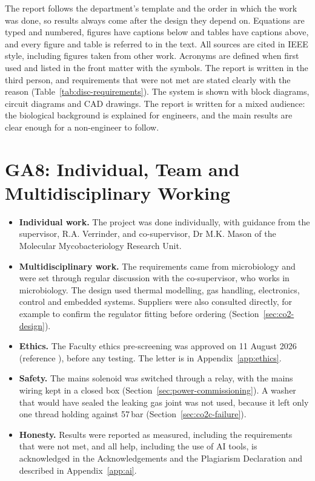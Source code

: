 The report follows the department's template and the order in which the work was done, so results always come after the design they depend on. Equations are typed and numbered, figures have captions below and tables have captions above, and every figure and table is referred to in the text. All sources are cited in IEEE style, including figures taken from other work. Acronyms are defined when first used and listed in the front matter with the symbols. The report is written in the third person, and requirements that were not met are stated clearly with the reason (Table~\ref{tab:disc-requirements}). The system is shown with block diagrams, circuit diagrams and CAD drawings. The report is written for a mixed audience: the biological background is explained for engineers, and the main results are clear enough for a non-engineer to follow.

\section{GA8: Individual, Team and Multidisciplinary Working}
\label{app:ga8}

\begin{itemize}[nosep]
    \item \textbf{Individual work.} The project was done individually, with guidance from the supervisor, R.A. Verrinder, and co-supervisor, Dr M.K. Mason of the Molecular Mycobacteriology Research Unit.
    \item \textbf{Multidisciplinary work.} The requirements came from microbiology and were set through regular discussion with the co-supervisor, who works in microbiology. The design used thermal modelling, gas handling, electronics, control and embedded systems. Suppliers were also consulted directly, for example to confirm the regulator fitting before ordering (Section~\ref{sec:co2-design}).
    \item \textbf{Ethics.} The Faculty ethics pre-screening was approved on 11 August 2026 (reference \ebeethicsnumber), before any testing. The letter is in Appendix~\ref{app:ethics}.
    \item \textbf{Safety.} The mains solenoid was switched through a relay, with the mains wiring kept in a closed box (Section~\ref{sec:power-commissioning}). A washer that would have sealed the leaking gas joint was not used, because it left only one thread holding against 57\,bar (Section~\ref{sec:co2c-failure}).
    \item \textbf{Honesty.} Results were reported as measured, including the requirements that were not met, and all help, including the use of AI tools, is acknowledged in the Acknowledgements and the Plagiarism Declaration and described in Appendix~\ref{app:ai}.
\end{itemize}

